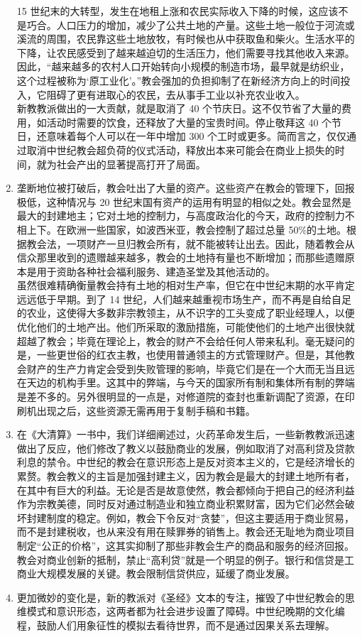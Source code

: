 \begin{enumerate}
    15 世纪末的大转型，发生在地租上涨和农民实际收入下降的时候，这应该不是巧合。人口压力的增加，减少了公共土地的产量。这些土地一般位于河流或溪流的周围，农民靠这些土地放牧，有时候也从中获取鱼和柴火。生活水平的下降，让农民感受到了越来越迫切的生活压力，他们需要寻找其他收入来源。因此，“越来越多的农村人口开始转向小规模的制造市场，最早就是纺织业，这个过程被称为‘原工业化’。”教会强加的负担抑制了在新经济方向上的时间投入，它阻碍了更有进取心的农民，去从事手工业以补充农业收入。\\ 
    
    新教教派做出的一大贡献，就是取消了 40 个节庆日。这不仅节省了大量的费用，如活动时需要的饮食，还释放了大量的宝贵时间。停止敬拜这 40 个节日，还意味着每个人可以在一年中增加 300 个工时或更多。简而言之，仅仅通过取消中世纪教会超负荷的仪式活动，释放出本来可能会在商业上损失的时间，就为社会产出的显著提高打开了局面。
    \item 垄断地位被打破后，教会吐出了大量的资产。这些资产在教会的管理下，回报极低，这种情况与 20 世纪末国有资产的运用有明显的相似之处。教会显然是最大的封建地主；它对土地的控制力，与高度政治化的今天，政府的控制力不相上下。在欧洲一些国家，如波西米亚，教会控制了超过总量 50\%的土地。根据教会法，一项财产一旦归教会所有，就不能被转让出去。因此，随着教会从信众那里收到的遗赠越来越多，教会的土地持有量也不断增加；而那些遗赠原本是用于资助各种社会福利服务、建造圣堂及其他活动的。\\
    
    虽然很难精确衡量教会持有土地的相对生产率，但它在中世纪末期的水平肯定远远低于早期。到了 14 世纪，人们越来越重视市场生产，而不再是自给自足的农业，这使得大多数非宗教领主，从不识字的工头变成了职业经理人，以便优化他们的土地产出。他们所采取的激励措施，可能使他们的土地产出很快就超越了教会；毕竟在理论上，教会的财产不会给任何人带来私利。毫无疑问的是，一些更世俗的红衣主教，也使用普通领主的方式管理财产。但是，其他教会财产的生产力肯定会受到失败管理的影响，毕竟它们是在一个大而无当且远在天边的机构手里。这其中的弊端，与今天的国家所有制和集体所有制的弊端是差不多的。另外很明显的一点是，对修道院的查封也重新调配了资源，在印刷机出现之后，这些资源无需再用于复制手稿和书籍。
    \item 在《大清算》一书中，我们详细阐述过，火药革命发生后，一些新教教派迅速做出了反应，他们修改了教义以鼓励商业的发展，例如取消了对高利贷及贷款利息的禁令。中世纪的教会在意识形态上是反对资本主义的，它是经济增长的累赘。教会教义的主旨是加强封建主义，因为教会是最大的封建土地所有者，在其中有巨大的利益。无论是否是故意使然，教会都倾向于把自己的经济利益作为宗教美德，同时反对通过制造业和独立商业积累财富，因为它们必然会破坏封建制度的稳定。例如，教会下令反对“贪婪”，但这主要适用于商业贸易，而不是封建税收，也从来没有用在赎罪券的销售上。教会还无耻地为商业项目制定“公正的价格”，这其实抑制了那些非教会生产的商品和服务的经济回报。教会对商业创新的抵制，禁止“高利贷”就是一个明显的例子。银行和信贷是工商业大规模发展的关键。教会限制信贷供应，延缓了商业发展。
    \item 更加微妙的变化是，新的教派对《圣经》文本的专注，摧毁了中世纪教会的思维模式和意识形态，这两者都为社会进步设置了障碍。中世纪晚期的文化编程，鼓励人们用象征性的模拟去看待世界，而不是通过因果关系去理解。\\ 
    

\end{enumerate}
